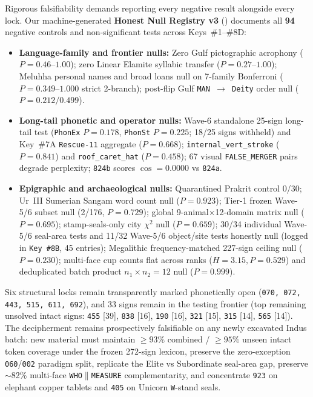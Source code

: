 \documentclass[11pt,a4paper]{article}
\begin{document}
Rigorous falsifiability demands reporting every negative result alongside every lock. Our machine-generated \textbf{Honest Null Registry v3} () documents all \textbf{94} negative controls and non-significant tests across Keys~\#1--\#8D:
\begin{itemize}
  \item \textbf{Language-family and frontier nulls:} Zero Gulf pictographic acrophony ($P = 0.46\text{--}1.00$); zero Linear Elamite syllabic transfer ($P = 0.27\text{--}1.00$); Meluhha personal names and broad loans null on 7-family Bonferroni ($P = 0.349\text{--}1.000$ strict 2-branch); post-flip Gulf \texttt{MAN $\to$ Deity} order null ($P = 0.212/0.499$).
  \item \textbf{Long-tail phonetic and operator nulls:} Wave-6 standalone 25-sign long-tail test (\texttt{PhonEx} $P = 0.178$, \texttt{PhonSt} $P = 0.225$; 18/25 signs withheld) and Key~\#7A \texttt{Rescue-11} aggregate ($P = 0.668$); \texttt{internal\_vert\_stroke} ($P = 0.841$) and \texttt{roof\_caret\_hat} ($P = 0.458$); 67 visual \texttt{FALSE\_MERGER} pairs degrade perplexity; \texttt{824b} scores $\cos = 0.0000$ vs \texttt{824a}.
  \item \textbf{Epigraphic and archaeological nulls:} Quarantined Prakrit control 0/30; Ur~III Sumerian Sangam word count null ($P = 0.923$); Tier-1 frozen Wave-5/6 subset null (2/176, $P = 0.729$); global 9-animal$\times$12-domain matrix null ($P = 0.695$); stamp-seals-only city $\chi^2$ null ($P = 0.659$); 30/34 individual Wave-5/6 seal-area tests and 11/32 Wave-5/6 object/site tests honestly null (logged in \texttt{Key \#8B}, 45 entries); Megalithic frequency-matched 227-sign ceiling null ($P = 0.230$); multi-face cup counts flat across ranks ($H = 3.15, P = 0.529$) and deduplicated batch product $n_1 \times n_2 = 12$ null ($P = 0.999$).
\end{itemize}

Six structural locks remain transparently marked phonetically open (\texttt{070, 072, 443, 515, 611, 692}), and 33 signs remain in the testing frontier (top remaining unsolved intact signs: \texttt{455} [39], \texttt{838} [16], \texttt{190} [16], \texttt{321} [15], \texttt{315} [14], \texttt{565} [14]). The decipherment remains prospectively falsifiable on any newly excavated Indus batch: new material must maintain $\ge 93\%$ combined / $\ge 95\%$ unseen intact token coverage under the frozen 272-sign lexicon, preserve the zero-exception \texttt{060}/\texttt{002} paradigm split, replicate the Elite vs Subordinate seal-area gap, preserve $\sim$82\% multi-face \texttt{WHO$\parallel$MEASURE} complementarity, and concentrate \texttt{923} on elephant copper tablets and \texttt{405} on Unicorn \texttt{W}-stand seals.
\end{document}
